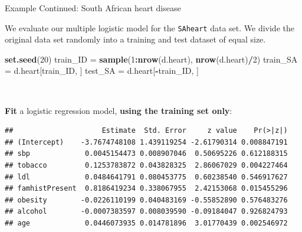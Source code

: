 \documentclass[
  10pt,
  ignorenonframetext,
]{beamer}
\newenvironment{Shaded}{\begin{snugshade}}{\end{snugshade}}
\newcommand{\AttributeTok}[1]{\textcolor[rgb]{0.13,0.29,0.53}{#1}}
\newcommand{\DecValTok}[1]{\textcolor[rgb]{0.00,0.00,0.81}{#1}}
\newcommand{\FunctionTok}[1]{\textcolor[rgb]{0.13,0.29,0.53}{\textbf{#1}}}
\newcommand{\NormalTok}[1]{#1}
\newcommand{\OtherTok}[1]{\textcolor[rgb]{0.56,0.35,0.01}{#1}}
\newcommand{\SpecialCharTok}[1]{\textcolor[rgb]{0.81,0.36,0.00}{\textbf{#1}}}
\newcommand{\StringTok}[1]{\textcolor[rgb]{0.31,0.60,0.02}{#1}}
\begin{document}
\begin{frame}[fragile]
\begin{block}{Example Continued: South African heart disease}
\protect\hypertarget{example-continued-south-african-heart-disease}{}
\vspace{2mm}

We evaluate our multiple logistic model for the \texttt{SAheart} data
set. We divide the original data set randomly into a training and test
dataset of equal size.

\vspace{2mm}

\scriptsize

\begin{Shaded}
\begin{Highlighting}[]
\FunctionTok{set.seed}\NormalTok{(}\DecValTok{20}\NormalTok{)}
\NormalTok{train\_ID }\OtherTok{=} \FunctionTok{sample}\NormalTok{(}\DecValTok{1}\SpecialCharTok{:}\FunctionTok{nrow}\NormalTok{(d.heart), }\FunctionTok{nrow}\NormalTok{(d.heart)}\SpecialCharTok{/}\DecValTok{2}\NormalTok{)}
\NormalTok{train\_SA }\OtherTok{=}\NormalTok{ d.heart[train\_ID, ]}
\NormalTok{test\_SA }\OtherTok{=}\NormalTok{ d.heart[}\SpecialCharTok{{-}}\NormalTok{train\_ID, ]}
\end{Highlighting}
\end{Shaded}

\normalsize

\(~\)

\textbf{Fit} a logistic regression model, \textbf{using the training set
only}:

\vspace{2mm}

\scriptsize

\begin{Shaded}
\end{Shaded}

\begin{verbatim}
##                     Estimate  Std. Error     z value    Pr(>|z|)
## (Intercept)    -3.7674748108 1.439119254 -2.61790314 0.008847191
## sbp             0.0045154473 0.008907046  0.50695226 0.612188315
## tobacco         0.1253783872 0.043828325  2.86067029 0.004227464
## ldl             0.0484641791 0.080453775  0.60238540 0.546917627
## famhistPresent  0.8186419234 0.338067955  2.42153068 0.015455296
## obesity        -0.0226110199 0.040483169 -0.55852890 0.576483276
## alcohol        -0.0007383597 0.008039590 -0.09184047 0.926824793
## age             0.0446073935 0.014781896  3.01770439 0.002546972
\end{verbatim}
\end{block}
\end{frame}
\end{document}
